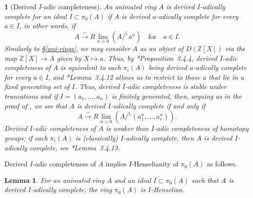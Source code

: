 \documentclass[11pt, reqno]{amsart}
\newcommand{\bL}{\mathbb{L}}
\newcommand{\bZ}{\mathbb{Z}}
\newcommand{\isomto}{\overset{\sim}{\longrightarrow}}
\newcommand{\ra}{\rightarrow}
\providecommand{\uscolon}{{\upshape;} }
\newcommand{\blem}{\begin{lemma}}
\newcommand{\elem}{\end{lemma}}
\providecommand{\qxq}[1]{\quad\text{#1}\quad}
\newcommand{\tst}{\textstyle}
\newcommand{\be}{\begin{equation}}
\newcommand{\ee}{\end{equation}}
\numberwithin{equation}{numberingbase}
\theoremstyle{thms}
\newtheorem{lemma}[numberingbase]{Lemma}
\theoremstyle{claims}
\theoremstyle{defs}
\theoremstyle{thms}
\theoremstyle{defs}
\theoremstyle{subsection-tweak}
\newtheorem{pp}[numberingbase]{}
\newcommand{\bpp}{\begin{pp}}
\newcommand{\epp}{\end{pp}}
\theoremstyle{subsection-tweak}
\begin{document}
\bpp[Derived $I$-adic completeness] \label{pp:derived-complete}
An animated ring $A$ is \emph{derived $I$-adically complete} for an ideal $I \subset \pi_0(A)$ if $A$ is derived $a$-adically complete for every $a \in I$, in other words, if
\[
\tst A \isomto R\lim_{n > 0} (A/^\bL a^n) \qxq{for} a \in I.
\]
Similarly to \S\ref{ani-rings}, we may consider $A$ as an object of $D(\bZ[X])$ via the map $\bZ[X] \ra A$ given by $X\mapsto a$. Thus, by \cite{BS15}*{Proposition~3.4.4}, derived $I$-adic completeness of $A$ is equivalent to each $\pi_i(A)$ being derived $a$-adically complete for every $a \in I$, and \cite{BS15}*{Lemma~3.4.12} allows us to restrict to those $a$ that lie in a fixed generating set of $I$. Thus, derived $I$-adic completeness is stable under truncations and if $I = (a_1, \dotsc, a_n)$ is finitely generated, then, arguing as in the proof of , we see that $A$ is derived $I$-adically complete if and only if
\be \label{eqn:continuity-condition}
\tst A \isomto R\lim_{n > 0} (A/^\bL (a_1^n, \dotsc, a_r^n)).
\ee
Derived $I$-adic completeness of $A$ is weaker than $I$-adic completeness of homotopy groups: if each $\pi_i(A)$ is (classically) $I$-adically complete, then $A$ is derived $I$-adically complete, see \cite{BS15}*{Lemma~3.4.13}.
\epp


Derived $I$-adic completeness of $A$ implies $I$-Henselianity of $\pi_0(A)$ as follows. 




\blem \label{lem:DC-comp-Hens}
For an animated ring $A$ and an ideal $I \subset \pi_0(A)$ such that $A$ is derived $I$-adically complete, the ring $\pi_0(A)$ is $I$-Henselian. %
\elem
\end{document}

